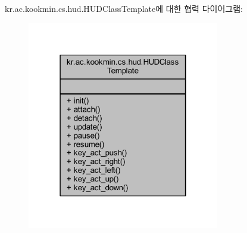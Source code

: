 kr.\+ac.\+kookmin.\+cs.\+hud.\+H\+U\+D\+Class\+Template에 대한 협력 다이어그램\+:\nopagebreak
\begin{figure}[H]
\begin{center}
\leavevmode
\includegraphics[width=238pt]{classkr_1_1ac_1_1kookmin_1_1cs_1_1hud_1_1_h_u_d_class_template__coll__graph}
\end{center}
\end{figure}
